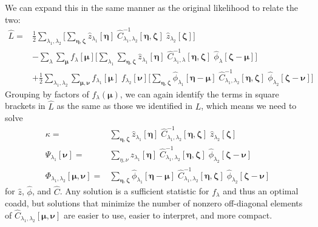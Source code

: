 \documentclass[DM,authoryear,toc]{lsstdoc}
\begin{document}
We can expand this in the same manner as the original likelihood to relate the two:
\begin{align}
\hat{L}=&
    \frac{1}{2}\sum_{\lambda_1,\lambda_2}
    \Bigg[
        \sum_{\bm{\eta},\bm{\zeta}}
        \hat{z}_{\lambda_1}[\bm{\eta}]
        \;\hat{C}^{-1}_{\lambda_1,\lambda_2}[\bm{\eta},\bm{\zeta}]
        \;\hat{z}_{\lambda_2}[\bm{\zeta}]
    \Bigg]
\nonumber\\
&-
    \sum_{\lambda}
    \sum_{\bm{\mu}}
        f_{\lambda}[\bm{\mu}]
    \Bigg[
        \sum_{\lambda_1}
        \sum_{\bm{\eta},\bm{\zeta}}
        \hat{z}_{\lambda_1}[\bm{\eta}]
        \; \hat{C}^{-1}_{\lambda_1,\lambda}[\bm{\eta},\bm{\zeta}]
        \; \hat{\phi}_{\lambda}[\bm{\zeta}-\bm{\mu}]
    \Bigg]
\nonumber\\
&+
    \frac{1}{2}\sum_{\lambda_1,\lambda_2}
        \sum_{\bm{\mu},\bm{\nu}}
        f_{\lambda_1}[\bm{\mu}]
        \; f_{\lambda_2}[\bm{\nu}]
    \Bigg[
        \sum_{\bm{\eta},\bm{\zeta}}
        \hat{\phi}_{\lambda_1}[\bm{\eta}-\bm{\mu}]
        \; \hat{C}^{-1}_{\lambda_1,\lambda_2}[\bm{\eta},\bm{\zeta}]
        \; \hat{\phi}_{\lambda_2}[\bm{\zeta}-\bm{\nu}]
    \Bigg]
\end{align}
Grouping by factors of $f_{\lambda}(\bm{\mu})$, we can again identify the terms in square brackets in $\hat{L}$ as the same as those we identified in $L$, which means we need to solve
\begin{align}
    \kappa = &
        \sum_{\bm{\eta},\bm{\zeta}}
        \hat{z}_{\lambda_1}[\bm{\eta}]
        \; \hat{C}^{-1}_{\lambda_1,\lambda_2}[\bm{\eta},\bm{\zeta}]
        \; \hat{z}_{\lambda_2}[\bm{\zeta}]
    \label{eqn:kappa-factorization}
    \\
    \Psi_{\lambda_1}[\bm{\nu}] = &
        \sum_{\eta,\nu}
        \hat{z}_{\lambda_1}[\bm{\eta}]
        \; \hat{C}_{\lambda_1,\lambda_2}^{-1}\![\bm{\eta},\bm{\zeta}]
        \; \hat{\phi}_{\lambda_2}\![\bm{\zeta}-\bm{\nu}]
    \label{eqn:psi-factorization}
    \\
    \Phi_{\lambda_1,\lambda_2}[\bm{\mu}, \bm{\nu}] = &
        \sum_{\bm{\eta},\bm{\zeta}}
        \hat{\phi}_{\lambda_1}[\bm{\eta}-\bm{\mu}]
        \; \hat{C}^{-1}_{\lambda_1,\lambda_2}[\bm{\eta},\bm{\zeta}]
        \; \hat{\phi}_{\lambda_2}[\bm{\zeta}-\bm{\nu}]
    \label{eqn:phi-factorization}
\end{align}
for $\hat{z}$, $\hat{\phi}$, and $\hat{C}$.
Any solution is a sufficient statistic for $f_{\lambda}$ and thus an optimal coadd, but solutions that minimize the number of nonzero off-diagonal elements of $\hat{C}_{\lambda_1,\lambda_2}[\bm{\mu},\bm{\nu}]$ are easier to use, easier to interpret, and more compact.



\end{document}
